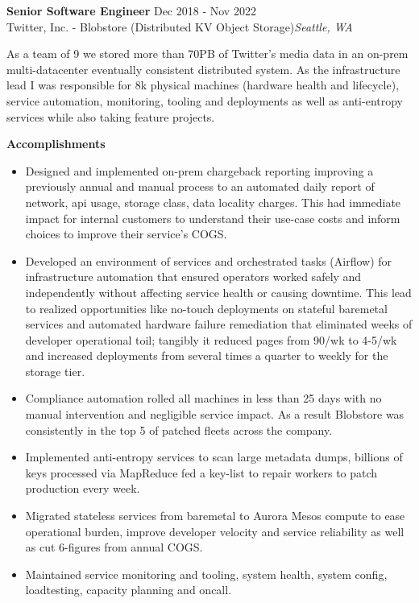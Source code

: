 \begin{mdframed}[linewidth=2,linecolor=blue, innertopmargin=1em, innerbottommargin=1em, topline=false, rightline=false, bottomline=false]
    \textbf{Senior Software Engineer} \hfill Dec 2018 - Nov 2022\\
    Twitter, Inc. - Blobstore (Distributed KV Object Storage)\hfill \textit{Seattle, WA}
    
    As a team of 9 we stored more than 70PB of Twitter's media data in an on-prem multi-datacenter eventually consistent distributed system. As the infrastructure lead I was responsible for 8k physical machines (hardware health and lifecycle), service automation, monitoring, tooling and deployments as well as anti-entropy services while also taking feature projects. 
    
    {\bf Accomplishments}
     \begin{itemize}
        \itemsep -5pt {} 
         \item Designed and implemented on-prem chargeback reporting improving a previously annual and manual process to an automated daily report of network, api usage, storage class, data locality charges. This had immediate impact for internal customers to understand their use-case costs and inform choices to improve their service's COGS.
         \item Developed an environment of services and orchestrated tasks (Airflow) for infrastructure automation that ensured operators worked safely and independently without affecting service health or causing downtime. This lead to realized opportunities like no-touch deployments on stateful baremetal services and automated hardware failure remediation that eliminated weeks of developer operational toil; tangibly it reduced pages from 90/wk to 4-5/wk and increased deployments from several times a quarter to weekly for the storage tier.
         \item Compliance automation rolled all machines in less than 25 days with no manual intervention and negligible service impact. As a result Blobstore was consistently in the top 5 of patched fleets across the company. 
         \item Implemented anti-entropy services to scan large metadata dumps, billions of keys processed via MapReduce fed a key-list to repair workers to patch production every week. 
         \item Migrated stateless services from baremetal to Aurora Mesos compute to ease operational burden, improve developer velocity and service reliability as well as cut 6-figures from annual COGS.
         \item Maintained service monitoring and tooling, system health, system config, loadtesting, capacity planning and oncall.
     \end{itemize}
    \end{mdframed}
